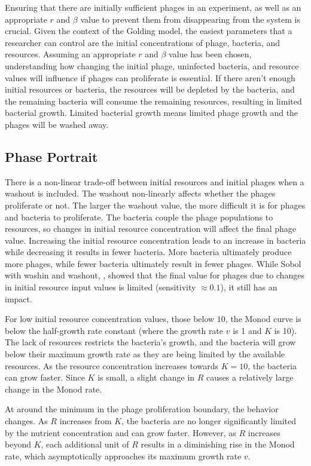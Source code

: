 Ensuring that there are initially sufficient phages in an experiment, as well as an appropriate $r$ and $\beta$ value to prevent them from disappearing from the system is crucial. 
Given the context of the Golding model, the easiest parameters that a researcher can control are the initial concentrations of phage, bacteria, and resources. 
Assuming an appropriate $r$ and $\beta$ value has been chosen, understanding how changing the initial phage, uninfected bacteria, and resource values will influence if phages can proliferate is essential. 
If there aren't enough initial resources or bacteria, the resources will be depleted by the bacteria, and the remaining bacteria will consume the remaining resources, resulting in limited bacterial growth. 
Limited bacterial growth means limited phage growth and the phages will be washed away. 

\subsection{Phase Portrait}
There is a non-linear trade-off between initial resources and initial phages when a washout is included. 
The washout non-linearly affects whether the phages proliferate or not. 
The larger the washout value, the more difficult it is for phages and bacteria to proliferate. 
The bacteria couple the phage populations to resources, so changes in initial resource concentration will affect the final phage value. 
Increasing the initial resource concentration leads to an increase in bacteria while decreasing it results in fewer bacteria.
More bacteria ultimately produce more phages, while fewer bacteria ultimately result in fewer phages.
While Sobol with washin and washout, , showed that the final value for phages due to changes in initial resource input values is limited (sensitivity $\approx 0.1$), it still has an impact. 

For low initial resource concentration values, those below $10$, the Monod curve is below the half-growth rate constant (where the growth rate $v$ is 1 and $K$ is 10). 
The lack of resources restricts the bacteria's growth, and the bacteria will grow below their maximum growth rate as they are being limited by the available resources. 
As the resource concentration increases towards $K=10$, the bacteria can grow faster. 
Since $K$ is small, a slight change in $R$ causes a relatively large change in the Monod rate. 

At around the minimum in the phage proliferation boundary, the behavior changes. 
As $R$ increases from $K$, the bacteria are no longer significantly limited by the nutrient concentration and can grow faster.
However, as $R$ increases beyond $K$, each additional unit of $R$ results in a diminishing rise in the Monod rate, which asymptotically approaches its maximum growth rate $v$. 

